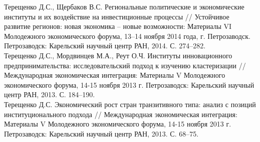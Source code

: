 \documentclass[10pt]{article}
\newcommand{\years}[1]{\marginnote{\scriptsize #1}}
\begin{document}
\years{2014}Терещенко Д.С., Щербаков В.С. Региональные политические и экономические институты и их воздействие на инвестиционные процессы // Устойчивое развитие регионов: новая экономика – новые возможности: Материалы VI Молодежного экономического форума, 13–14 ноября 2014 года, г. Петрозаводск. Петрозаводск: Карельский научный центр РАН, 2014. С. 274–282.\\
\years{2013}Терещенко Д.С., Мордвинцев М.А., Реут О.Ч. Институты инновационного предпринимательства: исследовательский подход к изучению кластеризации // Международная экономическая интеграция: Материалы V Молодежного экономического форума, 14-15 ноября 2013 г. Петрозаводск: Карельский научный центр РАН, 2013. С. 184–190.\\
\years{2013}Терещенко Д.С. Экономический рост стран транзитивного типа: анализ с позиций институционального подхода // Международная экономическая интеграция: Материалы V Молодежного экономического форума, 14-15 ноября 2013 г. Петрозаводск: Карельский научный центр РАН, 2013. С. 68–75.\\
\end{document}
